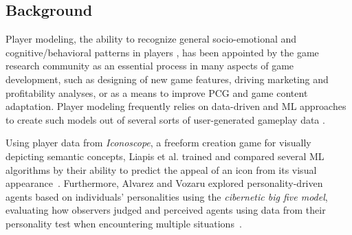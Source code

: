 \subsection{Background}


Player modeling, the ability to recognize general socio-emotional
and cognitive/behavioral patterns in players , has been appointed by the game research community as an essential process in many aspects of game development, such as designing of new game features, driving marketing and profitability analyses, or as a means to improve PCG and game content adaptation. Player modeling frequently relies on data-driven and ML approaches to create such models out of several sorts of user-generated gameplay data .

Using player data from \textit{Iconoscope}, a freeform creation game for visually depicting semantic concepts, Liapis et al. trained and compared several ML algorithms by their ability to predict the appeal of an icon from its visual appearance~. Furthermore, Alvarez and Vozaru explored personality-driven agents based on individuals' personalities using the \textit{cibernetic big five model}, evaluating how observers judged and perceived agents using data from their personality test when encountering multiple situations~. 



